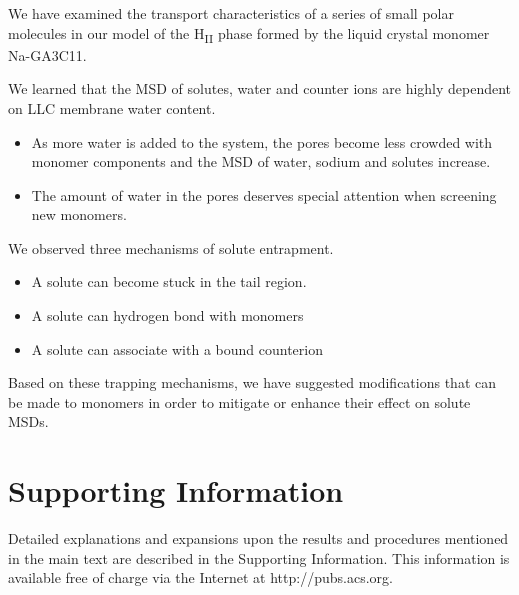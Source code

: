 \documentclass{article}
\begin{document}
  We have examined the transport characteristics of a series of small polar
  molecules in our model of the H\textsubscript{II} phase formed by the liquid 
  crystal monomer Na-GA3C11.

  We learned that the MSD of solutes, water and counter ions are highly dependent 
  on LLC membrane water content.
  \begin{itemize}
    \item As more water is added to the system, the pores become less crowded
    with monomer components and the MSD of water, sodium and solutes increase.
    \item The amount of water in the pores deserves special attention when 
    screening new monomers.
  \end{itemize}

  
  We observed three mechanisms of solute entrapment.
  \begin{itemize}
    \item A solute can become stuck in the tail region. 
    \item A solute can hydrogen bond with monomers
    \item A solute can associate with a bound counterion
  \end{itemize}
  
  Based on these trapping mechanisms, we have suggested modifications that
  can be made to monomers in order to mitigate or enhance their effect on
  solute MSDs.
 
  \section*{Supporting Information}

  Detailed explanations and expansions upon the results and procedures mentioned in
  the main text are described in the Supporting Information. This information is
  available free of charge via the Internet at http://pubs.acs.org.
\end{document}
